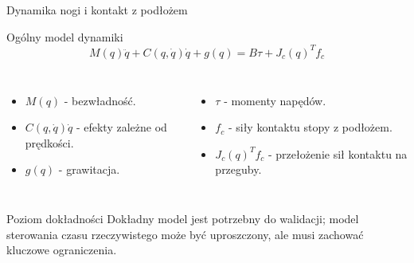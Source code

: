 \begin{frame}{Dynamika nogi i kontakt z podłożem}
\begin{block}{Ogólny model dynamiki}
\[
M(q)\ddot q + C(q,\dot q)\dot q + g(q) = B\tau + J_c(q)^T f_c
\]
\end{block}
\begin{columns}[T,onlytextwidth]
\begin{itemize}
  \item $M(q)$ - bezwładność.
  \item $C(q,\dot q)\dot q$ - efekty zależne od prędkości.
  \item $g(q)$ - grawitacja.
\end{itemize}
\begin{itemize}
  \item $\tau$ - momenty napędów.
  \item $f_c$ - siły kontaktu stopy z podłożem.
  \item $J_c(q)^T f_c$ - przełożenie sił kontaktu na przeguby.
\end{itemize}
\end{columns}
\begin{block}{Poziom dokładności}
Dokładny model jest potrzebny do walidacji; model sterowania czasu rzeczywistego może być uproszczony, ale musi zachować kluczowe ograniczenia.
\end{block}
\end{frame}
